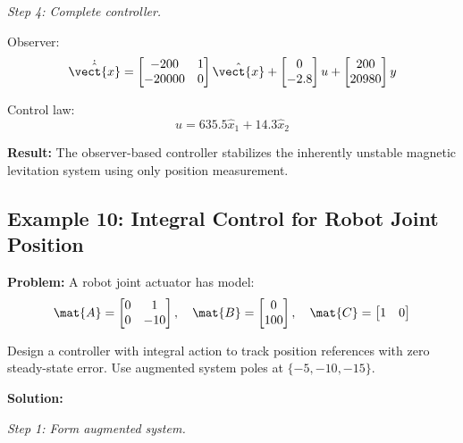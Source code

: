 \textit{Step 4: Complete controller.}

Observer:
\begin{equation}
\dot{\hat{\vect{x}}} = \begin{bmatrix} -200 & 1 \\ -20000 & 0 \end{bmatrix}\hat{\vect{x}} +
\begin{bmatrix} 0 \\ -2.8 \end{bmatrix}u +
\begin{bmatrix} 200 \\ 20980 \end{bmatrix}y
\end{equation}

Control law:
\begin{equation}
u = 635.5\hat{x}_1 + 14.3\hat{x}_2
\end{equation}

\textbf{Result:} The observer-based controller stabilizes the inherently unstable magnetic levitation system using only position measurement.

\subsection{Example 10: Integral Control for Robot Joint Position}

\textbf{Problem:} A robot joint actuator has model:
\begin{equation}
\mat{A} = \begin{bmatrix} 0 & 1 \\ 0 & -10 \end{bmatrix}, \quad
\mat{B} = \begin{bmatrix} 0 \\ 100 \end{bmatrix}, \quad
\mat{C} = \begin{bmatrix} 1 & 0 \end{bmatrix}
\end{equation}

Design a controller with integral action to track position references with zero steady-state error. Use augmented system poles at $\{-5, -10, -15\}$.

\textbf{Solution:}

\textit{Step 1: Form augmented system.}

